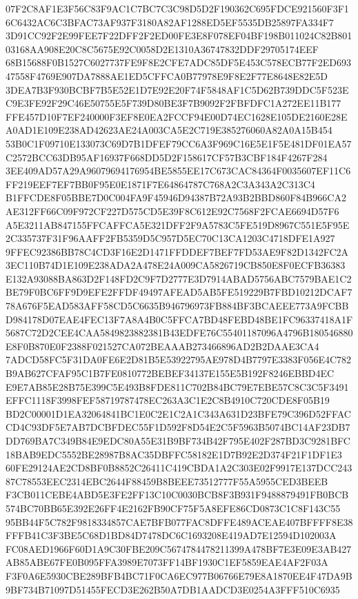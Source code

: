 \documentclass[UTF8,fontset=fandol,zihao=-4,a4paper]{ctexart}
\begin{document}
{{07F2C8AF1E3F56C83F9AC1C7BC7C3C98D5D2F190362C695FDCE921560F3F16C6432AC6C3BFAC73AF937F3180A82AF1288ED5EF5535DB25897FA334F7
3D91CC92F2E99FEE7F22DFF2F2ED00FE3E8F078EF04BF198B011024C82B80103168AA908E20C8C5675E92C0058D2E1310A36747832DDF29705174EEF
68B15688F0B1527C6027737FE9F8E2CFE7ADC85DF5E453C578ECB77F2ED69347558F4769E907DA7888AE1ED5CFFCA0B77978E9F8E2F77E8648E82E5D
3DEA7B3F930BCBF7B5E52E1D7E92E20F74F5848AF1C5D62B739DDC5F523EC9E3FE92F29C46E50755E5F739D80BE3F7B9092F2FBFDFC1A272EE11B177
FFE457D10F7EF240000F3EF8E0EA2FCCF94E00D74EC1628E105DE2160E28EA0AD1E109E238AD42623AE24A003CA5E2C719E385276060A82A0A15B454
53B0C1F09710E133073C69D7B1DFEF79CC6A3F969C16E5E1F5E481DF01EA57C2572BCC63DB95AF16937F668DD5D2F158617CF57B3CBF184F4267F284
3EE409AD57A29A96079694176954BE5855EE17C673CAC84364F0035607EF11C6FF219EEF7EF7BB0F95E0E1871F7E64864787C768A2C3A343A2C313C4
B1FFCDE8F05BBE7D0C004FA9F45946D94387B72A93B2BBD860F84B966CA2AE312FF66C09F972CF227D575CD5E39F8C612E92C7568F2FCAE6694D57F6
A5E3211AB847155FFCAFFCA5E321DFF2F9A5783C5FE519D8967C551E5F95E2C335737F31F96AAFF2FB5359D5C957D5EC70C13CA1203C4718DFE1A927
9FFEC92386BB78C4CD3F16E2D1471FFDDEF7BEF7FD53AE9F82D1342FC2A3EC110B74D1E109E238ADA2A478E24A009CA5826719CB850E8F0ECFB36383
E132A93088BA863D2F148FD2C9F7D2777E3D7914ABAD5756ABC7579BAE1C2BE79F0BC6FF9D9EFE2FFDF49497AFEAD5AB5FE519229B7FBD10212DCAF7
78A676F5EAD583AFF58CD5C6635B946796973FB884BF3BCAEEE773A9FCBBD984178D07EAE4FEC13F7A8A4B0C5FFCA7BD48FEBD48BE1FC96337418A1F
5687C72D2CEE4CAA5849823882381B43EDFE76C55401187096A4796B180546880E8F0B870E0F2388F021527CA072BEAAAB273466896AD2B2DAAE3CA4
7ADCD58FC5F31DA0FE6E2D81B5E53922795AE978D4B7797E3383F056E4C782B9AB627CFAF95C1B7FE0810772BEBEF34137E155E5B192F8246EBBD4EC
E9E7AB85E28B75E399C5E493B8FDE811C702B84BC79E7EBE57C8C3C5F3491EFFC1118F3998FEF58719787478EC263A3C1E2C8B4910C720CDE8F05B19
BD2C00001D1EA32064841BC1E0C2E1C2A1C343A631D23BFE79C396D52FFACCD4C93DF5E7AB7DCBFDEC55F1D592F8D54E2C5F5963B5074BC14AF23DB7
DD769BA7C349B84E9EDC80A55E31B9BF734B42F795E402F287BD3C9281BFC18BAB9EDC5552BE28987B8AC35DBFFC58182E1D7B92E2D374F21F1DF1E3
60FE29124AE2CD8BF0B8852C26411C419CBDA1A2C303E02F9917E137DCC24387C78553EEC2314EBC2644F88459B8BEEE73512777F55A5955CED3BEEB
F3CB011CEBE4ABD5E3FE2FF13C10C0030BCB8F3B931F9488879491FB0BCB574BC70BB65E392E26FF4E2162FB90CF75F5A8EFE86CD0873C1C8F143C55
95BB44F5C782F9818334857CAE7BFB077FAC8DFFE489ACEAE407BFFFF8E38FFFB41C3F3BE5C68D1BD84D7478DC6C1693208E419AD7E12594D102003A
FC08AED1966F60D1A9C30FBE209C5674784478211399A478BF7E3E09E3AB427AB85ABE67FE0B095FFA3989E7073FF14BF1930C1EF5859EAE4AF2F03A
F3F0A6E5930CBE289BFB4BC71F0CA6EC977B06766E79E8A1870EE4F47DA9B9BF734B71097D51455FECD3E262B50A7DB1AADCD3E0254A3FFF510C6935
}}
\end{document}
